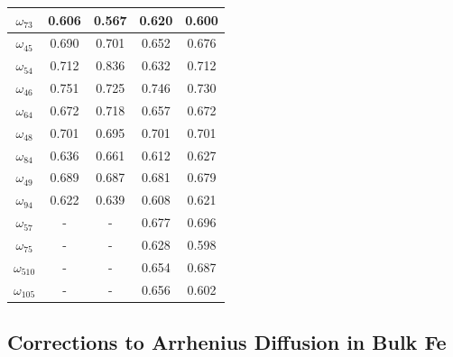\documentclass[preprint,12pt]{elsarticle}
\begin{document}
\begin{table}[!ht]
\begin{tabular}{|c|c|c|c|c|}
       \hline
       $\omega_{73}$  &0.606 &0.567 &0.620 &0.600 \\
       \hline
       $\omega_{45}$ &0.690 &0.701 &0.652 &0.676 \\ 
       \hline
       $\omega_{54}$ &0.712 &0.836 &0.632 &0.712 \\
       \hline
       $\omega_{46}$ &0.751 &0.725 &0.746 &0.730 \\
       \hline
       $\omega_{64}$ &0.672 &0.718 &0.657 &0.672 \\
       \hline
       $\omega_{48}$ &0.701 &0.695 &0.701 &0.701 \\ 
       \hline
       $\omega_{84}$  &0.636 &0.661 &0.612 &0.627 \\
       \hline
       $\omega_{49}$ &0.689 &0.687 &0.681 &0.679 \\ 
       \hline
       $\omega_{94}$  &0.622 &0.639 &0.608 &0.621 \\
       \hline
       $\omega_{57}$ &- &- &0.677 &0.696 \\ 
       \hline
       $\omega_{75}$  &- &- &0.628 &0.598 \\
       \hline
       $\omega_{510}$ &- &- &0.654 &0.687 \\ 
       \hline
       $\omega_{105}$  &- &- &0.656 &0.602 \\
       \hline
    \end{tabular}
\end{table}



\FloatBarrier
\subsection{Corrections to Arrhenius Diffusion in Bulk Fe}
\end{document}
